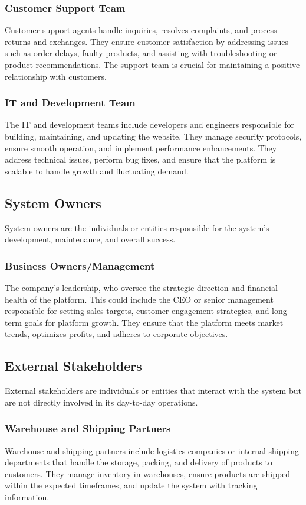 \documentclass[a4paper,journal]{IEEEtran}
\begin{document}
\subsubsection{Customer Support Team}
Customer support agents handle inquiries, resolves complaints, and process
returns and exchanges.
They ensure customer satisfaction by addressing issues such as order delays,
faulty products, and assisting with troubleshooting or product recommendations. 
The support team is crucial for maintaining a positive relationship with
customers.

\subsubsection{IT and Development Team}
The IT and development teams include
developers and engineers responsible for building, maintaining, and updating the
website.
They manage security protocols, ensure smooth operation, and implement
performance enhancements. They address technical issues, perform bug fixes,
and ensure that the platform is scalable to handle growth and fluctuating
demand.

\subsection{System Owners}
System owners are the individuals or entities responsible for the system's
development, maintenance, and overall success.

\subsubsection{Business Owners/Management}
The company's leadership, who oversee the strategic direction and financial
health of the platform.
This could include the CEO or senior management
responsible for setting sales targets, customer engagement strategies, and
long-term goals for platform growth.
They ensure that the platform meets market
trends, optimizes profits, and adheres to corporate objectives.

\subsection{External Stakeholders}
External stakeholders are individuals or entities that interact with the system
but are not directly involved in its day-to-day operations.

\subsubsection{Warehouse and Shipping Partners}
Warehouse and shipping partners include logistics companies or internal shipping
departments that handle the storage, packing, and delivery of products to
customers.
They manage inventory in warehouses, ensure products are shipped within the
expected timeframes, and update the system with tracking information.
\end{document}
